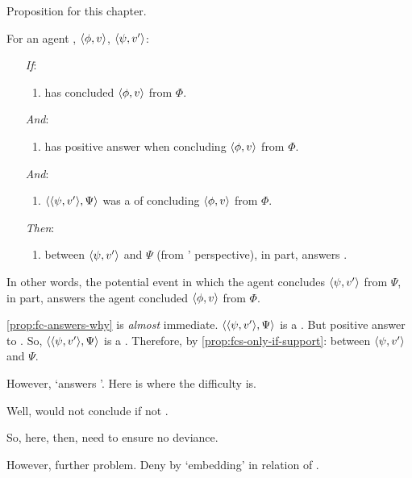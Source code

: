 \begin{note}
  Proposition for this chapter.

  \begin{proposition}
    \label{prop:fc-answers-why}
    For an agent \vAgent{}, \(\langle \phi, v \rangle\), \(\langle \psi, v' \rangle\):

    \begin{enumerate}
    \item[\emph{If}:]
      \begin{enumerate}[label=\alph*., ref=(\alph*)]
      \item
        \vAgent{} has concluded \(\langle \phi, v \rangle\) from \(\Phi\).
      \end{enumerate}
    \item[\emph{And}:]
      \begin{enumerate}[label=\alph*., ref=(\alph*), resume]
      \item
        \qzS{} has positive answer when concluding \(\langle \phi, v \rangle\) from \(\Phi\).
      \end{enumerate}
    \item[\emph{And}:]
      \begin{enumerate}[label=\alph*., ref=(\alph*), resume]
      \item \(\langle \langle \psi, v' \rangle, \Psi \rangle\) was a \requ{} of concluding \(\langle \phi, v \rangle\) from \(\Phi\).
      \end{enumerate}
    \item[\emph{Then}:]
      \begin{enumerate}[label=\alph*., ref=(\alph*), resume]
      \item {} between \(\langle \psi, v' \rangle\) and \(\Psi\) (from \vAgent{}' perspective), in part, answers \qWhyV{}.
      \end{enumerate}
    \end{enumerate}
  \end{proposition}
  In other words, the potential event in which the agent concludes \(\langle \psi, v' \rangle\) from \(\Psi\), in part, answers \qWhyV{} the agent concluded \(\langle \phi, v \rangle\) from \(\Phi\).
\end{note}

\begin{note}
  \autoref{prop:fc-answers-why} is \emph{almost} immediate.
  \(\langle \langle \psi, v' \rangle, \Psi \rangle\) is a .
  But positive answer to \qzS{}.
  So, \(\langle \langle \psi, v' \rangle, \Psi \rangle\) is a .
  Therefore, by \autoref{prop:fcs-only-if-support}:
   between \(\langle \psi, v' \rangle\) and \(\Psi\).

  However, `answers \qWhy{}'.
  Here is where the difficulty is.

  Well, would not conclude if not \fc{}.

  So, here, then, need to ensure no deviance.

  However, further problem.
  Deny by `embedding' in relation of \support{}.
\end{note}

